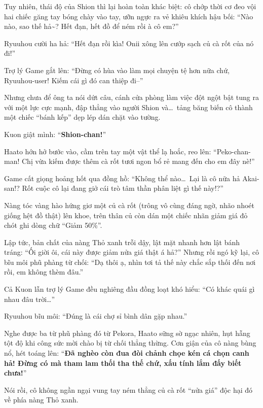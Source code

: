 \documentclass[../main.tex]{subfiles}
\begin{document}
Tuy nhiên, thái độ của Shion thì lại hoàn toàn khác biệt: cô chớp thời cơ đeo vội hai chiếc găng tay bóng chày vào tay, ưỡn ngực ra vẻ khiêu khích hậu bối: ``Nào nào, sao thế hả\~{}? Hết đạn, hết đồ để ném rồi à cô em?''


Ryuuhou cười ha hả: ``Hết đạn rồi kìa! Onii xông lên cướp sạch củ cà rốt của nó đi!''

Trợ lý Game gắt lên: ``Đừng có hùa vào làm mọi chuyện tệ hơn nữa chứ, Ryuuhou-user! Kiếm cái gì đó can thiệp đi--''

Nhưng chưa để ông ta nói dứt câu, cánh cửa phòng làm việc đột ngột bật tung ra với một lực cực mạnh, đập thẳng vào người Shion và\dots\ tảng băng biến cô thành một chiếc ``bánh kếp'' dẹp lép dán chặt vào tường.

Kuon giật mình: ``\textbf{Shion-chan!}''

Haato hớn hở bước vào, cầm trên tay một vật thể lạ hoắc, reo lên: ``Peko-chan-man! Chị vừa kiếm được thêm cà rốt tươi ngon bổ rẻ mang đến cho em đây nè!''

Game cất giọng hoảng hốt qua đồng hồ: ``Không thể nào\dots\ Lại là cô nữa hả Akai-san!? Rốt cuộc cô lại đang giở cái trò tâm thần phân liệt gì thế này!?''

Nàng tóc vàng hào hứng giơ một củ cà rốt (trông vô cùng đáng ngờ, nhão nhoét giống hệt đồ thật) lên khoe, trên thân củ còn dán một chiếc nhãn giảm giá đỏ chót ghi dòng chữ ``Giảm 50\%''.


Lập tức, bản chất của nàng Thỏ xanh trỗi dậy, lật mặt nhanh hơn lật bánh tráng: ``Ối giời ôi, cái này được giảm nửa giá thật á hả?'' Nhưng rồi ngó kỹ lại, cô bĩu môi phũ phàng từ chối: ``Dạ thôi ạ, nhìn tơi tả thế này chắc sắp thối đến nơi rồi, em không thèm đâu.''

Cả Kuon lẫn trợ lý Game đều nghiêng đầu đồng loạt khó hiểu: ``Có khác quái gì nhau đâu trời\dots''

Ryuuhou bĩu môi: ``Đúng là cái chợ sỉ bình dân gặp nhau.''

Nghe được ba từ phũ phàng đó từ Pekora, Haato sững sờ ngạc nhiên, hụt hẫng tột độ khi công sức mời chào bị từ chối thẳng thừng. Cơn giận của cô nàng bùng nổ, hét toáng lên: ``\textbf{Đã nghèo còn đua đòi chảnh chọe kén cá chọn canh hả! Đừng có mà tham lam thối tha thế chứ, xấu tính lắm đấy biết chưa!}''

Nói rồi, cô không ngần ngại vung tay ném thẳng củ cà rốt ``nửa giá'' độc hại đó về phía nàng Thỏ xanh.
\end{document}
